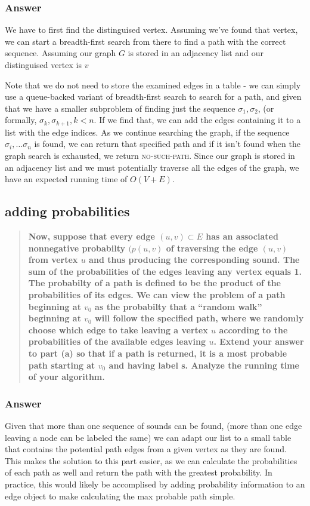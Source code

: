 \documentclass[titlepage]{article}\usepackage[]{graphicx}\usepackage[]{color}
\begin{document}
\subsubsection{Answer}
We have to first find the distinguised vertex. Assuming we've found that
vertex, we can start a breadth-first search from there to find a path with the
correct sequence. Assuming our graph $G$ is stored in an adjacency list and our
distinguised vertex is $v$

Note that we do not need to store the examined edges in a table - we can simply
use a queue-backed variant of breadth-first search to search for a path, and
given that we have a smaller subproblem of finding just the sequence $\sigma_1,
\sigma_2$, (or formally, $\sigma_k, \sigma_{k+1}, k<n$. If we find that, we can add the edges containing it to a list with
the edge indices. As we continue searching the graph, if the sequence
$\sigma_i, \dots \sigma_n$ is found, we can return that specified path and if
it isn't found when the graph search is exhausted, we return
\textsc{no-such-path}. 
Since our graph is stored in an adjacency list and we must potentially traverse
all the edges of the graph, we have an expected running time of $O(V+E)$. 
  	
\subsection{adding probabilities}

\begin{quote}
	\textbf{Now, suppose that every edge $(u,v) \subset E$ has an associated
		nonnegative probabilty $(p(u,v)$ of traversing the edge $(u,v)$ from
		vertex $u$ and thus producing the corresponding sound. The sum of the
		probabilities of the edges leaving any vertex equals 1. The probabilty of
		a path is defined to be the product of the probabilities of its edges. We
		can view the problem of a path beginning at $v_0$ as the probabilty that a
		``random walk'' beginning at $v_0$  will follow the specified path, where
		we randomly choose which edge to take leaving a vertex  $u$ according to
		the probabilities of the available edges leaving $u$. 
		Extend your answer to part (a) so that if a path is returned,
		it is a most probable path starting at $v_0$ and having label s. Analyze
	the running time of your algorithm. }
\end{quote}

\subsubsection{Answer}
Given that more than one sequence of sounds can be found, (more than one edge
leaving a node can be labeled the same) we can adapt our list to a small table
that contains the potential path edges from a given vertex as they are found.
This makes the solution to this part easier, as we can calculate the
probabilities of each path as well and return the path with the greatest
probability. In practice, this would likely be accomplised by adding
probability information to an edge object to make calculating the max probable
path simple.
\end{document}
